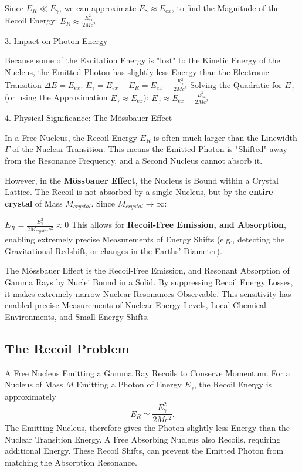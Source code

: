 \documentclass[a4paper, 10pt, onepage]{elegantbook}
\begin{document}
{Since $E_R \ll E_\gamma$, we can approximate $E_\gamma \approx E_{ex}$, to find the Magnitude of the Recoil Energy:
$ E_R \approx \frac{E_{ex}^2}{2Mc^2} $  

    3. Impact on Photon Energy  

\noindent

Because some of the Excitation Energy is "lost" to the Kinetic Energy of the Nucleus, the Emitted Photon has slightly 
less Energy than the Electronic Transition $\Delta E = E_{ex}$.  
$ E_\gamma = E_{ex} - E_R = E_{ex} - \frac{E_\gamma^2}{2Mc^2} $  
Solving the Quadratic for $E_\gamma$ (or using the Approximation $E_\gamma \approx E_{ex}$):  
$ E_\gamma \approx E_{ex} - \frac{E_{ex}^2}{2Mc^2} $  

    4. Physical Significance: The M\"ossbauer Effect  

\noindent

In a Free Nucleus, the Recoil Energy $E_R$ is often much larger than the Linewidth $\Gamma$ of the Nuclear Transition. 
This means the Emitted Photon is "Shifted" away from the Resonance Frequency, and a Second Nucleus cannot absorb it.  

However, in the \textbf{M\"ossbauer Effect}, the Nucleus is Bound within a Crystal Lattice. The Recoil is not
absorbed by a single Nucleus, but by the \textbf{entire crystal} of Mass $M_{crystal}$. Since $M_{crystal} \to \infty$: 
 
$ E_R = \frac{E_\gamma^2}{2M_{crystal}c^2} \approx 0 $  
This allows for \textbf{Recoil-Free Emission, and Absorption}, enabling extremely precise Measurements of Energy Shifts 
(e.g., detecting the Gravitational Redshift, or changes in the Earths' Diameter).  



The M\"ossbauer Effect is the Recoil-Free Emission, and Resonant Absorption of Gamma Rays by Nuclei Bound in a 
Solid. By suppressing Recoil Energy Losses, it makes extremely narrow Nuclear Resonances Observable. This sensitivity 
has enabled precise Measurements of Nuclear Energy Levels, Local Chemical Environments, and Small Energy Shifts.  

\subsection{The Recoil Problem}

\noindent

A Free Nucleus Emitting a Gamma Ray Recoils to Conserve Momentum. For a Nucleus of Mass $M$ Emitting a Photon of Energy 
$E_\gamma$, the Recoil Energy is approximately  
\begin{equation}
  E_R \simeq \frac{E_\gamma^2}{2Mc^2}.
\end{equation}
The Emitting Nucleus, therefore gives the Photon slightly less Energy than the Nuclear Transition Energy. A Free 
Absorbing Nucleus also Recoils, requiring additional Energy. These Recoil Shifts, can prevent the Emitted Photon from 
matching the Absorption Resonance.  

}
\end{document}
